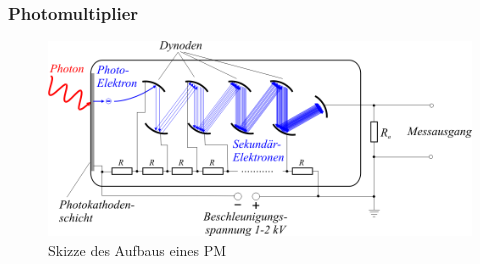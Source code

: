     \subsubsection{Photomultiplier}
    \begin{figure}
        \centering \includegraphics[scale=1]{pic/pm.png}
        \caption{\cite{pm} Skizze des Aufbaus eines PM}
        \label{pm}
    \end{figure}
